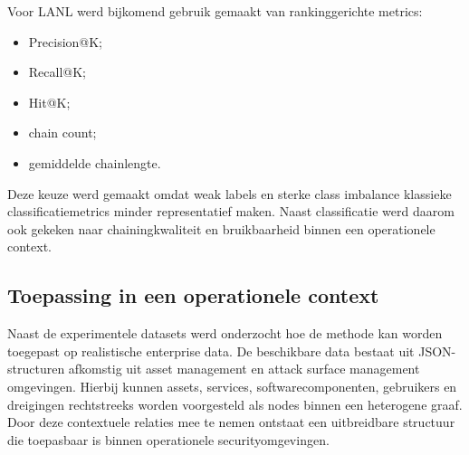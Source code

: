 Voor LANL werd bijkomend gebruik gemaakt van rankinggerichte metrics:
\begin{itemize}
    \item Precision@K;
    \item Recall@K;
    \item Hit@K;
    \item chain count;
    \item gemiddelde chainlengte.
\end{itemize}

Deze keuze werd gemaakt omdat weak labels en sterke class imbalance klassieke classificatiemetrics minder representatief maken.
\newline
\newline
Naast classificatie werd daarom ook gekeken naar chainingkwaliteit en bruikbaarheid binnen een operationele context.

\section{Toepassing in een operationele context}

Naast de experimentele datasets werd onderzocht hoe de methode kan worden toegepast op realistische enterprise data.
\newline
\newline
De beschikbare data bestaat uit JSON-structuren afkomstig uit asset management en attack surface management omgevingen.
\newline
\newline
Hierbij kunnen assets, services, softwarecomponenten, gebruikers en dreigingen rechtstreeks worden voorgesteld als nodes binnen een heterogene graaf.
\newline
\newline
Door deze contextuele relaties mee te nemen ontstaat een uitbreidbare structuur die toepasbaar is binnen operationele securityomgevingen.

\chapter{}%
\label{ch:resultaten}

